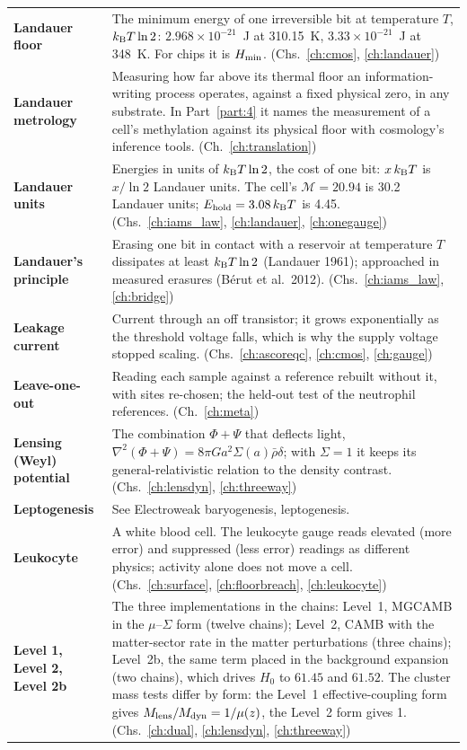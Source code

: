 {\begin{longtable}{@{}>{\raggedright\arraybackslash}p{}>{\raggedright\arraybackslash}p{}@{}}
\textbf{Landauer floor} & The minimum energy of one irreversible bit at temperature $T$, $k_{\mathrm B} T\ln2$: $2.968\times10^{-21}$~J at 310.15~K, $3.33\times10^{-21}$~J at 348~K. For chips it is $H_{\min}$. {\footnotesize(Chs.~\ref{ch:cmos}, \ref{ch:landauer})}\\[1pt]
\textbf{Landauer metrology} & Measuring how far above its thermal floor an information-writing process operates, against a fixed physical zero, in any substrate. In Part~\ref{part:4} it names the measurement of a cell's methylation against its physical floor with cosmology's inference tools. {\footnotesize(Ch.~\ref{ch:translation})}\\[1pt]
\textbf{Landauer units} & Energies in units of $k_{\mathrm B} T\ln2$, the cost of one bit: $x\,k_{\mathrm B} T$ is $x/\ln2$ Landauer units. The cell's $\mathcal M=20.94$ is 30.2 Landauer units; $E_{\rm hold}=3.08\,k_{\mathrm B} T$ is 4.45. {\footnotesize(Chs.~\ref{ch:iams_law}, \ref{ch:landauer}, \ref{ch:onegauge})}\\[1pt]
\textbf{Landauer's principle} & Erasing one bit in contact with a reservoir at temperature $T$ dissipates at least $k_{\mathrm B} T\ln2$ (Landauer 1961); approached in measured erasures (B\'erut et al.\ 2012). {\footnotesize(Chs.~\ref{ch:iams_law}, \ref{ch:bridge})}\\[1pt]
\textbf{Leakage current} & Current through an off transistor; it grows exponentially as the threshold voltage falls, which is why the supply voltage stopped scaling. {\footnotesize(Chs.~\ref{ch:ascoreqc}, \ref{ch:cmos}, \ref{ch:gauge})}\\[1pt]
\textbf{Leave-one-out} & Reading each sample against a reference rebuilt without it, with sites re-chosen; the held-out test of the neutrophil references. {\footnotesize(Ch.~\ref{ch:meta})}\\[1pt]
\textbf{Lensing (Weyl) potential} & The combination $\Phi+\Psi$ that deflects light, $\nabla^2(\Phi+\Psi)=8\pi Ga^2\Sigma(a)\bar\rho\delta$; with $\Sigma=1$ it keeps its general-relativistic relation to the density contrast. {\footnotesize(Chs.~\ref{ch:lensdyn}, \ref{ch:threeway})}\\[1pt]
\textbf{Leptogenesis} & See Electroweak baryogenesis, leptogenesis.\\[1pt]
\textbf{Leukocyte} & A white blood cell. The leukocyte gauge reads elevated (more error) and suppressed (less error) readings as different physics; activity alone does not move a cell. {\footnotesize(Chs.~\ref{ch:surface}, \ref{ch:floorbreach}, \ref{ch:leukocyte})}\\[1pt]
\textbf{Level 1, Level 2, Level 2b} & The three implementations in the chains: Level~1, MGCAMB in the $\mu$--$\Sigma$ form (twelve chains); Level~2, CAMB with the matter-sector rate in the matter perturbations (three chains); Level~2b, the same term placed in the background expansion (two chains), which drives $H_0$ to $61.45$ and $61.52$. The cluster mass tests differ by form: the Level~1 effective-coupling form gives $M_{\rm lens}/M_{\rm dyn}=1/\mu(z)$, the Level~2 form gives 1. {\footnotesize(Chs.~\ref{ch:dual}, \ref{ch:lensdyn}, \ref{ch:threeway})}\\[1pt]

\end{longtable}}
